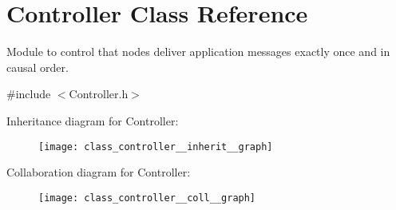 \hypertarget{class_controller}{}\section{Controller Class Reference}
\label{class_controller}


Module to control that nodes deliver application messages exactly once and in causal order.  




{\ttfamily \#include $<$Controller.\+h$>$}



Inheritance diagram for Controller\+:\nopagebreak
\begin{figure}[H]
\begin{center}
\leavevmode
\texttt{[image: class\_controller\_\_inherit\_\_graph]}
\end{center}
\end{figure}


Collaboration diagram for Controller\+:\nopagebreak
\begin{figure}[H]
\begin{center}
\leavevmode
\texttt{[image: class\_controller\_\_coll\_\_graph]}
\end{center}
\end{figure}
